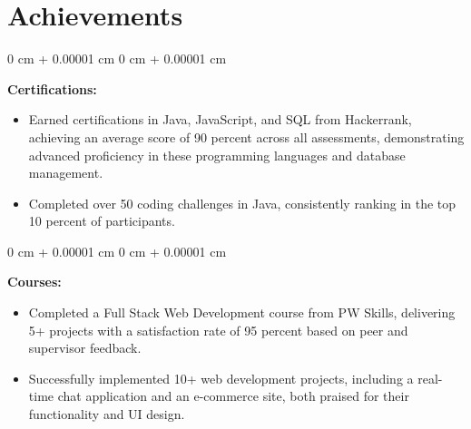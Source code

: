 \documentclass[10pt, letterpaper]{article}
\newenvironment{highlights}{
    \begin{itemize}[
        topsep=0.10 cm,
        parsep=0.10 cm,
        partopsep=0pt,
        itemsep=0pt,
        leftmargin=0 cm + 10pt
    ]
}{
    \end{itemize}
} %
\newenvironment{onecolentry}{
    \begin{adjustwidth}{
        0 cm + 0.00001 cm
    }{
        0 cm + 0.00001 cm
    }
}{
    \end{adjustwidth}
} %
\begin{document}
    \section{Achievements}
\begin{onecolentry}
    \textbf{Certifications:}
    \begin{highlights}
        \item Earned certifications in Java, JavaScript, and SQL from Hackerrank, achieving an average score of 90 percent across all assessments, demonstrating advanced proficiency in these programming languages and database management.

        \item Completed over 50 coding challenges in Java, consistently ranking in the top 10 percent of participants.
    \end{highlights}
\end{onecolentry}

\vspace{0.2 cm}
\begin{onecolentry}
    \textbf{Courses:}

    \begin{highlights}
        \item Completed a Full Stack Web Development course from PW Skills, delivering 5+ projects with a satisfaction rate of 95 percent based on peer and supervisor feedback.
        \item Successfully implemented 10+ web development projects, including a real-time chat application and an e-commerce site, both praised for their functionality and UI design.
    \end{highlights}
\end{onecolentry}
\end{document}
